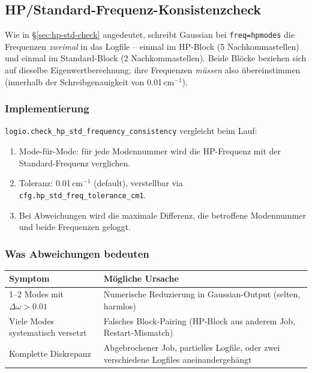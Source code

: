 \documentclass[11pt,a4paper,twoside]{article}
\theoremstyle{remark}
\begin{document}
\subsection{HP/Standard-Frequenz-Konsistenzcheck}
\label{sec:hp-std}

Wie in \S\ref{sec:hp-std-check} angedeutet, schreibt Gaussian
bei \texttt{freq=hpmodes} die Frequenzen \emph{zweimal} in das
Logfile -- einmal im HP-Block (5 Nachkommastellen) und einmal im
Standard-Block (2 Nachkommastellen). Beide Bl\"ocke beziehen sich auf
dieselbe Eigenwertberechnung; ihre Frequenzen \emph{m\"ussen} also
\"ubereinstimmen (innerhalb der Schreibgenauigkeit von 0.01\,cm$^{-1}$).

\subsubsection*{Implementierung}

\texttt{logio.check\_hp\_std\_frequency\_consistency} vergleicht beim
Lauf:

\begin{enumerate}
  \item Mode-f\"ur-Mode: f\"ur jede Modennummer wird die HP-Frequenz
        mit der Standard-Frequenz verglichen.
  \item Toleranz: 0.01\,cm$^{-1}$ (default), verstellbar via
        \texttt{cfg.hp\_std\_freq\_tolerance\_cm1}.
  \item Bei Abweichungen wird die maximale Differenz, die betroffene
        Modennummer und beide Frequenzen geloggt.
\end{enumerate}

\subsubsection*{Was Abweichungen bedeuten}

\begin{center}
\begin{tabularx}{\textwidth}{l X}
\toprule
\textbf{Symptom} & \textbf{M\"ogliche Ursache} \\
\midrule
1--2 Modes mit $\Delta\omega > 0.01$ &
  Numerische Reduzierung in Gaussian-Output (selten, harmlos) \\
Viele Modes systematisch versetzt &
  Falsches Block-Pairing (HP-Block aus anderem Job, Restart-Mismatch) \\
Komplette Diskrepanz &
  Abgebrochener Job, partielles Logfile, oder zwei verschiedene
  Logfiles aneinandergeh\"angt \\
\bottomrule
\end{tabularx}
\end{center}
\end{document}
